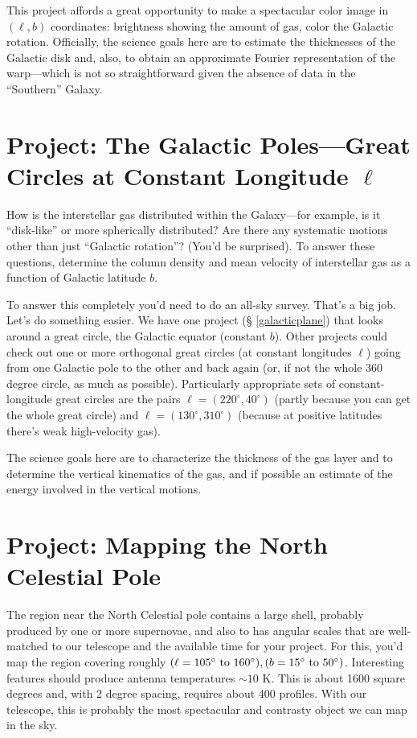 \documentclass[psfig,preprint]{aastex}
\begin{document}
This project affords a great opportunity to make a spectacular color
image in $(\ell,b)$ coordinates: brightness showing the amount of gas,
color the Galactic rotation.  Officially, the science goals here are to
estimate the thicknesses of the Galactic disk and, also, to obtain an
approximate Fourier representation of the warp---which is not so
straightforward given the absence of data in the ``Southern'' Galaxy.

\section{Project: The Galactic Poles---Great Circles at Constant Longitude $\ell$}
\label{galacticpoles}

\noindent
How is the interstellar gas distributed within the Galaxy---for example,
is it ``disk-like'' or more spherically distributed? Are there any
systematic motions other than just ``Galactic rotation''? (You'd be
surprised).  To answer these questions, determine the column density
and mean velocity of interstellar gas as a function of Galactic latitude
$b$. 

	To answer this completely you'd need to do an all-sky survey. That's
a big job.  Let's do something easier. We have one project (\S
\ref{galacticplane}) that looks around a great circle, the Galactic
equator (constant $b$). Other projects could check out one or more
orthogonal great circles (at constant longitudes $\ell$) going from one
Galactic pole to the other and back again (or, if not the whole 360
degree circle, as much as possible).  Particularly appropriate sets of
constant-longitude great circles are the pairs $\ell = (220^\circ,
40^\circ)$ (partly because you can get the whole great circle) and $\ell
= (130^\circ, 310^\circ)$ (because at positive latitudes there's weak
high-velocity gas).

	The science goals here are to characterize the thickness of the
gas layer and to determine the vertical kinematics of the gas, and if
possible an estimate of the energy involved in the vertical motions.

\section{Project: Mapping the North Celestial Pole} \label{celestial}

\noindent
The region near the North Celestial pole contains a large shell,
probably produced by one or more supernovae, and also to has angular
scales that are well-matched to our telescope and the available time for
your project. For this, you'd map the region covering roughly
$(\ell=105^\circ \ {\rm to} \ 160^\circ), (b=15^\circ \ {\rm to}
\ 50^\circ)$. Interesting features should produce antenna temperatures
$\sim 10$ K. This is about 1600 square degrees and, with 2 degree
spacing, requires about 400 profiles. With our telescope, this is
probably the most spectacular and contrasty object we can map in the
sky.
\end{document}
